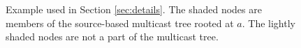 \begin{figure}[t]
  \begin{center}
  \end{center}
\caption{Example used in Section \ref{sec:details}.  The shaded nodes are members of the source-based multicast tree rooted at $a$.  The lightly shaded nodes are not a part of the multicast tree.}
\label{fig:intuition-example}
\end{figure}


